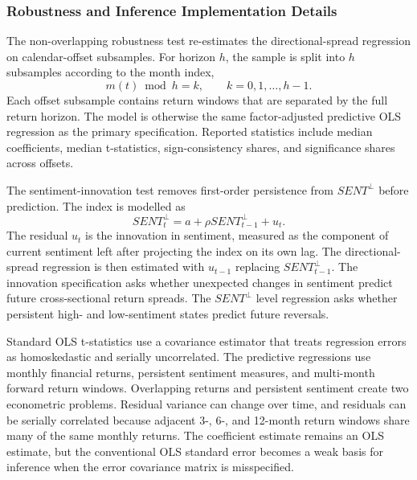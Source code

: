 \documentclass[11pt]{article}
\newcommand{\var}[1]{\ensuremath{#1}}
\begin{document}
\subsubsection{Robustness and Inference Implementation Details}
\label{app:robustness_implementation_details}

The non-overlapping robustness test re-estimates the directional-spread regression on calendar-offset subsamples. For horizon \var{h}, the sample is split into \var{h} subsamples according to the month index,
\begin{equation}
    m(t) \bmod h = k,
    \qquad
    k = 0,1,\ldots,h-1.
\end{equation}
Each offset subsample contains return windows that are separated by the full return horizon. The model is otherwise the same factor-adjusted predictive OLS regression as the primary specification. Reported statistics include median coefficients, median t-statistics, sign-consistency shares, and significance shares across offsets.

The sentiment-innovation test removes first-order persistence from \var{SENT^{\perp}} before prediction. The index is modelled as
\begin{equation}
    SENT^{\perp}_{t}
    =
    a
    +
    \rho SENT^{\perp}_{t-1}
    +
    u_t.
\end{equation}
The residual \var{u_t} is the innovation in sentiment, measured as the component of current sentiment left after projecting the index on its own lag. The directional-spread regression is then estimated with \var{u_{t-1}} replacing \var{SENT^{\perp}_{t-1}}. The innovation specification asks whether unexpected changes in sentiment predict future cross-sectional return spreads. The \var{SENT^{\perp}} level regression asks whether persistent high- and low-sentiment states predict future reversals.

Standard OLS t-statistics use a covariance estimator that treats regression errors as homoskedastic and serially uncorrelated. The predictive regressions use monthly financial returns, persistent sentiment measures, and multi-month forward return windows. Overlapping returns and persistent sentiment create two econometric problems. Residual variance can change over time, and residuals can be serially correlated because adjacent 3-, 6-, and 12-month return windows share many of the same monthly returns. The coefficient estimate remains an OLS estimate, but the conventional OLS standard error becomes a weak basis for inference when the error covariance matrix is misspecified.
\end{document}
